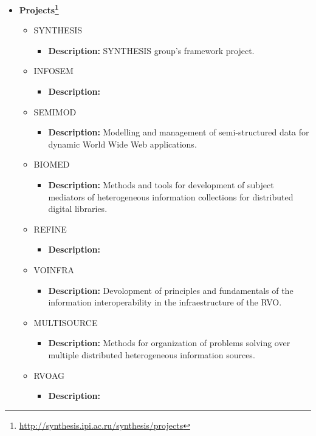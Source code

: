 \begin{itemize}
	\item \textbf{Projects\footnote{\url{http://synthesis.ipi.ac.ru/synthesis/projects}}}
	\begin{itemize}
		\item SYNTHESIS
			\begin{itemize}
				\item \textbf{Description:} SYNTHESIS group's framework
project.
			\end{itemize}
		\item INFOSEM
			\begin{itemize}
				\item \textbf{Description:}
			\end{itemize}
		\item SEMIMOD
			\begin{itemize}
				\item \textbf{Description:} Modelling and management of
semi-structured data for dynamic World Wide Web applications.
			\end{itemize}
		\item BIOMED
			\begin{itemize}
				\item \textbf{Description:} Methods and tools for development
of subject mediators of he\-te\-ro\-ge\-neous information collections for
distributed digital libraries.
			\end{itemize}
		\item REFINE
			\begin{itemize}
				\item \textbf{Description:}
			\end{itemize}
		\item VOINFRA
			\begin{itemize}
				\item \textbf{Description:} Devolopment of principles and
fundamentals of the information interoperability in the infraestructure of the
RVO.
			\end{itemize}
		\item MULTISOURCE
			\begin{itemize}
				\item \textbf{Description:} Methods for organization of
problems solving over multiple distributed he\-te\-ro\-ge\-neous information
sources.
			\end{itemize}
		\item RVOAG
			\begin{itemize}
				\item \textbf{Description:}

\end{itemize}
\end{itemize}
\end{itemize}
